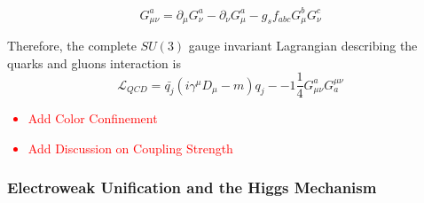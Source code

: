\begin{equation}
G^{a}_{\mu\nu} = \partial_{\mu}G^{a}_{\nu} - \partial_{\nu}G^{a}_{\mu} - g_{s}f_{abc}G^{b}_{\mu}G^{c}_{\nu}
\label{eqn:QCDFullLag}
\end{equation}

Therefore, the complete $SU(3)$ gauge invariant Lagrangian describing the quarks and gluons interaction is
\begin{equation}
\mathcal{L}_{QCD} = \bar{q_{j}}(i\gamma^{\mu}D_{\mu} - m )q_{j} - -1\frac{1}{4}G^{a}_{\mu\nu}G^{\mu\nu}_{a} 
\label{eqn:QCDInvLag}
\end{equation}

\textcolor{red}{
\begin{itemize}
\item{Add Color Confinement}
\item{Add Discussion on Coupling Strength}
\end{itemize}}

\subsubsection{Electroweak Unification and the Higgs Mechanism}
\label{subsubsec:EWkUni}


